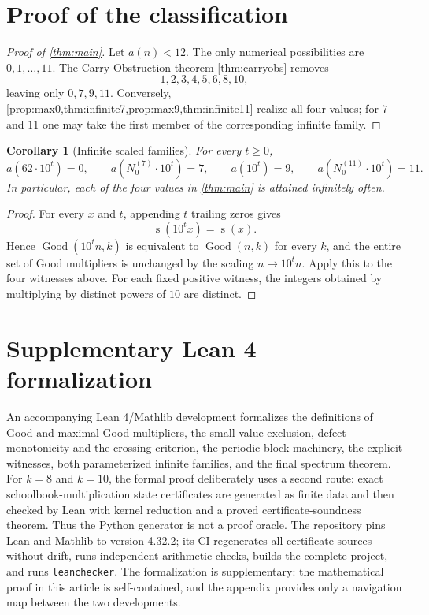 \documentclass[11pt]{article}
\newtheorem{corollary}[theorem]{Corollary}
\newcommand{\ds}{\operatorname{s}}
\newcommand{\Good}{\operatorname{Good}}
\begin{document}
\section{Proof of the classification}
\begin{proof}[Proof of \cref{thm:main}]
Let $a(n)<12$.  The only numerical possibilities are $0,1,\ldots,11$.  The Carry Obstruction theorem \cref{thm:carryobs} removes
\[
1,2,3,4,5,6,8,10,
\]
leaving only $0,7,9,11$.  Conversely, \cref{prop:max0,thm:infinite7,prop:max9,thm:infinite11} realize all four values; for $7$ and $11$ one may take the first member of the corresponding infinite family.
\end{proof}

\begin{corollary}[Infinite scaled families]\label{cor:scaled}
For every $t\ge0$,
\[
 a(62\cdot10^t)=0,\qquad
 a(N^{(7)}_0\cdot10^t)=7,\qquad
 a(10^t)=9,\qquad
 a(N^{(11)}_0\cdot10^t)=11.
\]
In particular, each of the four values in \cref{thm:main} is attained infinitely often.
\end{corollary}

\begin{proof}
For every $x$ and $t$, appending $t$ trailing zeros gives
\[
 \ds(10^t x)=\ds(x).
\]
Hence $\Good(10^t n,k)$ is equivalent to $\Good(n,k)$ for every $k$, and the entire set of Good multipliers is unchanged by the scaling $n\mapsto10^t n$.  Apply this to the four witnesses above.  For each fixed positive witness, the integers obtained by multiplying by distinct powers of $10$ are distinct.
\end{proof}

\section{Supplementary Lean 4 formalization}
An accompanying Lean 4/Mathlib development formalizes the definitions of Good and maximal Good multipliers, the small-value exclusion, defect monotonicity and the crossing criterion, the periodic-block machinery, the explicit witnesses, both parameterized infinite families, and the final spectrum theorem.  For $k=8$ and $k=10$, the formal proof deliberately uses a second route: exact schoolbook-multiplication state certificates are generated as finite data and then checked by Lean with kernel reduction and a proved certificate-soundness theorem.  Thus the Python generator is not a proof oracle.  The repository pins Lean and Mathlib to version 4.32.2; its CI regenerates all certificate sources without drift, runs independent arithmetic checks, builds the complete project, and runs \texttt{leanchecker}.  The formalization is supplementary: the mathematical proof in this article is self-contained, and the appendix provides only a navigation map between the two developments.
\end{document}
